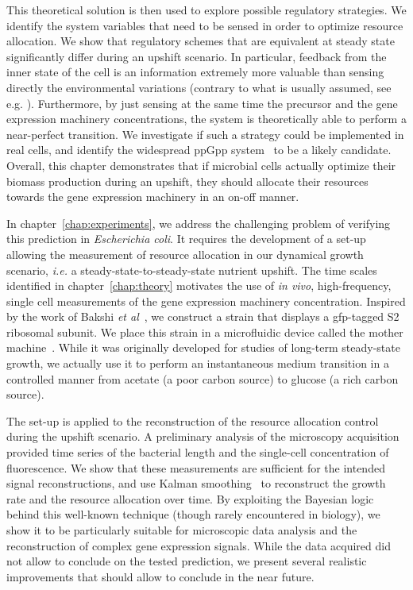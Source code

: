 This theoretical solution is then used to explore possible regulatory strategies.
We identify the system variables that need to be sensed in order to optimize resource allocation.
We show that regulatory schemes that are equivalent at steady state significantly differ during an upshift scenario.
In particular, feedback from the inner state of the cell is an information extremely more valuable than sensing directly the environmental variations (contrary to what is usually assumed, see e.g. \cite{levy_coordination_2009}).
Furthermore, by just sensing at the same time the precursor and the gene expression machinery concentrations, the system is theoretically able to perform a near-perfect transition.
We investigate if such a strategy could be implemented in real cells, and identify the widespread ppGpp system~\cite{bosdriesz_how_2015} to be a likely candidate.
Overall, this chapter demonstrates that if microbial cells actually optimize their biomass production during an upshift, they should allocate their resources towards the gene expression machinery in an on-off manner.

In chapter~\ref{chap:experiments}, we address the challenging problem of verifying this prediction in \textit{Escherichia coli}.
It requires the development of a set-up allowing the measurement of resource allocation in our dynamical growth scenario, \textit{i.e.} a steady-state-to-steady-state nutrient upshift.
The time scales identified in chapter~\ref{chap:theory} motivates the use of \textit{in vivo}, high-frequency, single cell measurements of the gene expression machinery concentration.
Inspired by the work of Bakshi \textit{et al}~\cite{bakshi_superresolution_2012}, we construct a strain that displays a gfp-tagged S2 ribosomal subunit.
We place this strain in a microfluidic device called the mother machine~\cite{wang_robust_2010}.
While it was originally developed for studies of long-term steady-state growth, we actually use it to perform an instantaneous medium transition in a controlled manner from acetate (a poor carbon source) to glucose (a rich carbon source).

The set-up is applied to the reconstruction of the resource allocation control during the upshift scenario.
A preliminary analysis of the microscopy acquisition provided time series of the bacterial length and the single-cell concentration of fluorescence.
We show that these measurements are sufficient for the intended signal reconstructions, and use Kalman smoothing~\cite{kailath_linear_2000,jazwinski_stochastic_2007} to reconstruct the growth rate and the resource allocation over time.
By exploiting the Bayesian logic behind this well-known technique (though rarely encountered in biology), we show it to be particularly suitable for microscopic data analysis and the reconstruction of complex gene expression signals.
While the data acquired did not allow to conclude on the tested prediction, we present several realistic improvements that should allow to conclude in the near future.